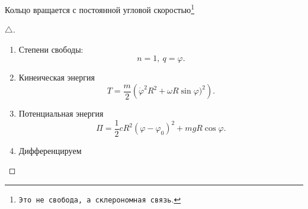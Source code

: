 Кольцо вращается с постоянной угловой скоростью\footnote{
    \texttt{Это не свобода, а склерономная связь}.
}
\begin{proof}[$\triangle$]
    \begin{minipage}[t]{0.9\textwidth}
        \begin{enumerate}[label = \Roman*.]
            \item Степени свободы:
            \begin{equation*}
                n=1, \ q = \varphi.
            \end{equation*}
            \item Кинеическая энергия
            \begin{equation*}
                T = \frac{m}{2} 
                \left(
                    \dot{\varphi}^2 R^2  + \omega R \sin \varphi)^2
                \right).
            \end{equation*}
            \item Потенциальная энергия
            \begin{equation*}
                \Pi = 
                \frac{1}{2} cR^2 (\varphi - \varphi_0)^2 + mg R \cos \varphi.
            \end{equation*}
            \item Дифференцируем
            
        \end{enumerate}
    \end{minipage}

\phantom{42}
\end{proof}